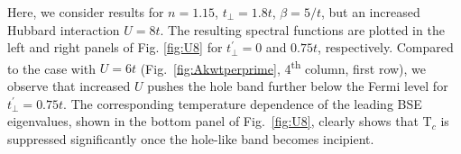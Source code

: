 \documentclass[prb,twocolumn,amsmath,amssymb,superscriptaddress,floatfix,nofootinbib]{revtex4-2}
\begin{document}
Here, we consider results for $n=1.15$, $t_\perp =1.8t$, $\beta=5/t$, but an increased Hubbard interaction $U=8t$. 
The resulting spectral functions are plotted in the left and right panels of Fig. \ref{fig:U8} for $t_\perp^{\prime}=0$ and $0.75t$, respectively. Compared to the case with $U=6t$ (Fig.~\ref{fig:Akwtperprime}, 4\textsuperscript{th} column, first row), we observe that increased $U$ pushes the hole band further below the Fermi level for $t_\perp^{\prime}=0.75t$. The corresponding temperature dependence of the leading BSE eigenvalues, shown in the bottom panel of Fig.~\ref{fig:U8}, clearly shows that T$_c$ is suppressed significantly once the hole-like band becomes incipient.






\end{document}
